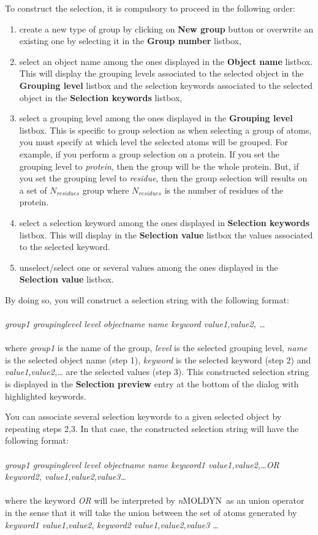 \documentclass[a4paper,11pt]{report}
\newcommand{\NMOLDYN}{\textit{n}MOLDYN}
\begin{document}
To construct the selection, it is compulsory to proceed in the following order:
\begin{enumerate}
\item create a new type of group by clicking on \textbf{New group} button or overwrite an existing one by selecting it in the \textbf{Group number} listbox,
\item select an object name among the ones displayed in the \textbf{Object name} listbox. This will 
display the grouping levels associated to the selected object in the \textbf{Grouping level} listbox and the selection 
keywords associated to the selected object in the \textbf{Selection keywords} listbox,
\item select a grouping level among the ones displayed in the \textbf{Grouping level} listbox. This is specific to group 
selection as when selecting a group of atoms, you must specify at which level the selected atoms will be grouped. For example, if you perform a group selection on a protein. If you set the grouping 
level to \textit{protein}, then the group will be the whole protein. But, if you set the grouping level to \textit{residue}, then
the group selection will results on a set of $N_{residues}$ group where $N_{residues}$ is the number of residues of the 
protein.
\item select a selection keyword among the ones displayed in \textbf{Selection keywords} listbox. This will display in the 
\textbf{Selection value} listbox the values associated to the selected keyword.
\item unselect/select one or several values among the ones displayed in the \textbf{Selection value} listbox.
\end{enumerate}
\newpage
By doing so, you will construct a selection string with the following format:
\\\\
\textit{group1 groupinglevel level objectname name keyword value1,value2, \ldots}
\\\\
where \textit{group1} is the name of the group, \textit{level} is the selected grouping level, \textit{name} is the selected object name (step 1), \textit{keyword} is the selected keyword (step 2) and 
\textit{value1,value2,\ldots} are the selected values (step 3). This constructed selection string is displayed in the \textbf{Selection preview} entry at the bottom of the dialog with highlighted keywords. 

You can associate several selection keywords to a given selected object by repeating steps 2,3. In that case, 
the constructed selection string will have the following format:
\\\\
\textit{group1 groupinglevel level objectname name keyword1 value1,value2,\ldots OR keyword2, value1,value2,value3\ldots}
\\\\
where the keyword \textit{OR} will be interpreted by \NMOLDYN\ as an union operator in the sense that it will take the 
union between the set of atoms generated by \textit{keyword1 value1,value2}, \textit{keyword2 value1,value2,value3} \ldots
\end{document}
